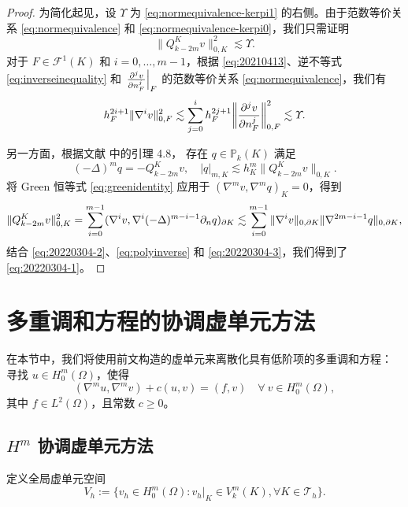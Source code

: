 \begin{proof}
为简化起见，设 $\varUpsilon$ 为 \eqref{eq:normequivalence-kerpi1} 的右侧。由于范数等价关系 \eqref{eq:normequivalence} 和 \eqref{eq:normequivalence-kerpi0}，我们只需证明
\begin{equation}\label{eq:20220304-1}
\|Q_{k-2m}^Kv\|_{0,K}^2\lesssim \varUpsilon.
\end{equation}
对于 $F\in\mathcal F^1(K)$ 和 $i=0,\ldots, m-1$，根据 \eqref{eq:20210413}、逆不等式 \eqref{eq:inverseinequality} 和 $\left.\frac{\partial^{j}v}{\partial n_F^{j}}\right|_F$ 的范数等价关系 \eqref{eq:normequivalence}，我们有
\begin{equation}\label{eq:20220304-2}
h_F^{2i+1}\|\nabla^iv\|_{0,F}^2\lesssim \sum_{j=0}^i h_{F}^{2j+1}\bigg\|\frac{\partial^{j}v}{\partial n_F^{j}}\bigg\|_{0,F}^2\lesssim \varUpsilon.
\end{equation}

另一方面，根据文献 \cite{Huang2020} 中的引理 4.8，
存在 $q\in\mathbb P_{k}(K)$ 满足
\begin{equation}\label{eq:20220304-3}
(-\Delta)^mq=-Q_{k-2m}^Kv, \quad |q|_{m,K}\lesssim h_K^{m}\|Q_{k-2m}^Kv\|_{0,K}.
\end{equation}
将 Green 恒等式 \eqref{eq:greenidentity} 应用于 $(\nabla^mv, \nabla^mq)_K=0$，得到
$$
\|Q_{k-2m}^Kv\|_{0,K}^2=\sum_{i=0}^{m-1}(\nabla^{i}v, \nabla^{i}(-\Delta)^{m-i-1}\partial_{n}q)_{\partial K}\lesssim \sum_{i=0}^{m-1}\|\nabla^{i}v\|_{0,\partial K}\|\nabla^{2m-i-1}q\|_{0,\partial K},
$$
结合 \eqref{eq:20220304-2}、\eqref{eq:polyinverse} 和 \eqref{eq:20220304-3}，我们得到了 \eqref{eq:20220304-1}。
\end{proof}
\section{多重调和方程的协调虚单元方法}\label{sec:vempolyharmonic}

在本节中，我们将使用前文构造的虚单元来离散化具有低阶项的多重调和方程：
寻找 $u\in H_0^m(\Omega)$，使得
\begin{equation}\label{eq:polyharmonic}
(\nabla^mu, \nabla^mv)+c(u, v)=(f, v)\quad\forall~v\in H_0^m(\Omega),
\end{equation}
其中 $f\in L^2(\Omega)$，且常数 $c\geq0$。

\subsection{$H^m$ 协调虚单元方法}
定义全局虚单元空间
$$
V_h:=\{v_h\in H_0^m(\Omega): v_h|_K\in V_{k}^{m}(K), \forall K\in\mathcal T_h\}.
$$

